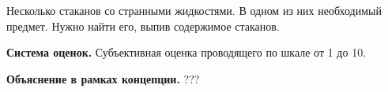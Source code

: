 
\par Несколько стаканов со странными жидкостями. В одном из них необходимый предмет. Нужно найти его, выпив содержимое стаканов.

\par \textbf{Система оценок.} Субъективная оценка проводящего по шкале от 1 до 10.

\par \textbf{Объяснение в рамках концепции.} ???